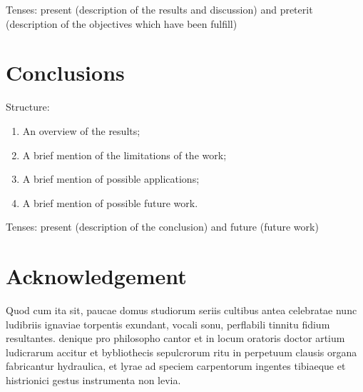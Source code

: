\documentclass[12pt,a4paper]{article}
\begin{document}
Tenses: present (description of the results and discussion) and preterit (description of the objectives which have been fulfill)

\section{Conclusions}
Structure:
\begin{enumerate}
\item	An overview of the results; 
\item A brief mention of the limitations of the work; 
\item A brief mention of possible applications; 
\item A brief mention of possible future work. 
\end{enumerate}

Tenses: present (description of the conclusion) and future (future work)


\section*{Acknowledgement}
Quod cum ita sit, paucae domus studiorum seriis cultibus antea celebratae nunc ludibriis ignaviae torpentis exundant, vocali sonu, perflabili tinnitu fidium resultantes. denique pro philosopho cantor et in locum oratoris doctor artium ludicrarum accitur et bybliothecis sepulcrorum ritu in perpetuum clausis organa fabricantur hydraulica, et lyrae ad speciem carpentorum ingentes tibiaeque et histrionici gestus instrumenta non levia.
\clearpage

 

\end{document}
